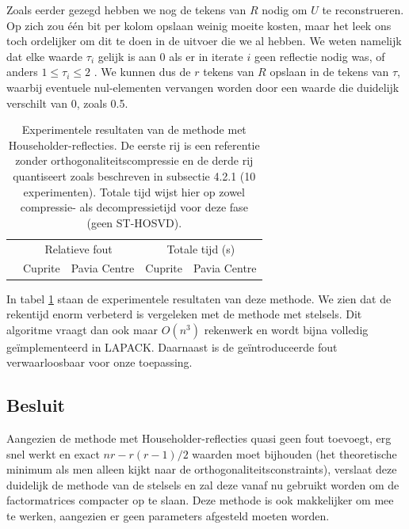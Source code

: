 Zoals eerder gezegd hebben we nog de tekens van $R$ nodig om $U$ te reconstrueren. Op zich zou \'e\'en bit per kolom opslaan weinig moeite kosten, maar het leek ons toch ordelijker om dit te doen in de uitvoer die we al hebben. We weten namelijk dat elke waarde $\tau_i$ gelijk is aan 0 als er in iterate $i$ geen reflectie nodig was, of anders $1 \leq \tau_i \leq 2$ \cite{ref:slarfg}. We kunnen dus de $r$ tekens van $R$ opslaan in de tekens van $\tau$, waarbij eventuele nul-elementen vervangen worden door een waarde die duidelijk verschilt van 0, zoals 0.5.

\begin{table}[H]
\centering
\begin{tabular}{|l|c|c|c|c|}
\hline
\multirow{2}{*}{} & \multicolumn{2}{c|}{Relatieve fout} & \multicolumn{2}{c|}{Totale tijd (s)} \\ \cline{2-5} 
 & Cuprite & Pavia Centre & Cuprite & Pavia Centre \\ \hline
                             
\end{tabular}
\caption{Experimentele resultaten van de methode met Householder-reflecties. De eerste rij is een referentie zonder orthogonaliteitscompressie en de derde rij quantiseert zoals beschreven in subsectie 4.2.1 (10 experimenten). Totale tijd wijst hier op zowel compressie- als decompressietijd voor deze fase (geen ST-HOSVD).}
\label{table:orthogonality-compression-householder-summary}
\end{table}

In tabel \ref{table:orthogonality-compression-householder-summary} staan de experimentele resultaten van deze methode. We zien dat de rekentijd enorm verbeterd is vergeleken met de methode met stelsels. Dit algoritme vraagt dan ook maar $O(n^3)$ rekenwerk en wordt bijna volledig ge\"implementeerd in LAPACK. Daarnaast is de ge\"introduceerde fout verwaarloosbaar voor onze toepassing.

\subsection{Besluit}

Aangezien de methode met Householder-reflecties quasi geen fout toevoegt, erg snel werkt en exact $nr - r(r - 1)/2$ waarden moet bijhouden (het theoretische minimum als men alleen kijkt naar de orthogonaliteitsconstraints), verslaat deze duidelijk de methode van de stelsels en zal deze vanaf nu gebruikt worden om de factormatrices compacter op te slaan. Deze methode is ook makkelijker om mee te werken, aangezien er geen parameters afgesteld moeten worden.
\newpage